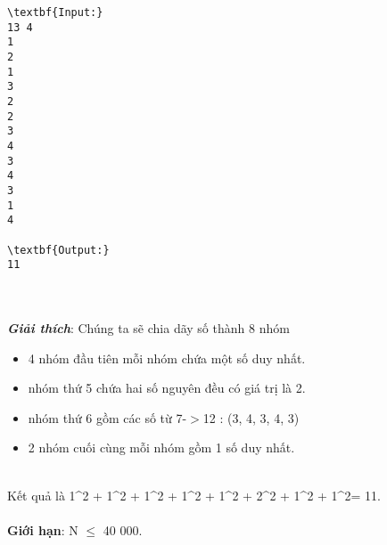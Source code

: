 \begin{verbatim}
\textbf{Input:}
13 4
1
2
1
3
2
2
3
4
3
4
3
1
4

\textbf{Output:}
11\end{verbatim}


\\
\\\textbf{\emph{Giải thích}}: Chúng ta sẽ chia dãy số thành 8 nhóm
\begin{itemize}
	\item 4 nhóm đầu tiên mỗi nhóm chứa một số duy nhất.
	\item nhóm thứ 5 chứa hai số nguyên đều có giá trị là 2.
	\item nhóm thứ 6 gồm các số từ 7-$>$12 : (3, 4, 3, 4, 3)
	\item 2 nhóm cuối cùng mỗi nhóm gồm 1 số duy nhất.
\end{itemize}


\\Kết quả là 1^2 + 1^2 + 1^2 + 1^2 + 1^2 + 2^2 + 1^2 + 1^2= 11.
\\
\\\textbf{Giới hạn}: N  $\le$  40 000.